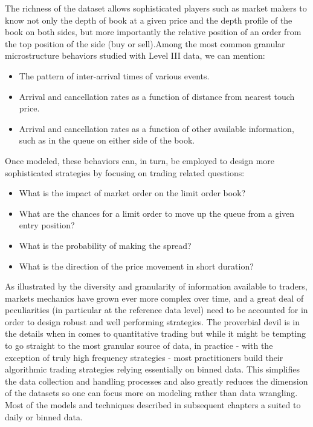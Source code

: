 The richness of the dataset allows sophisticated players such as market makers to know not only the depth of book at a given price and the depth profile of the book on both sides, but more importantly the relative position of an order from the top position of the side (buy or sell).Among the most common granular microstructure behaviors studied with Level III data, we can mention:
        \begin{itemize}
        \item The pattern of inter-arrival times of various events.
        \item Arrival and cancellation rates as a function of distance from nearest touch price.
        \item Arrival and cancellation rates as a function of other available information, such as in the queue on either side of the book.
        \end{itemize}
Once modeled, these behaviors can, in turn, be employed to design more sophisticated strategies by focusing on trading related questions:
        \begin{itemize}
        \item What is the impact of market order on the limit order book?
        \item What are the chances for a limit order to move up the queue from a given entry position?
        \item What is the probability of making the spread?
        \item What is the direction of the price movement in short duration?
        \end{itemize}

As illustrated by the diversity and granularity of information available to traders, markets mechanics have grown ever more complex over time, and a great deal of peculiarities (in particular at the reference data level) need to be accounted for in order to design robust and well performing strategies. The proverbial devil is in the details when in comes to quantitative trading but while it might be tempting to go straight to the most granular source of data, in practice - with the exception of truly high frequency strategies - most practitioners build their algorithmic trading strategies relying essentially on binned data. This simplifies the data collection and handling processes and also greatly reduces the dimension of the datasets so one can focus more on modeling rather than data wrangling. Most of the models and techniques described in subsequent chapters a suited to daily or binned data.






